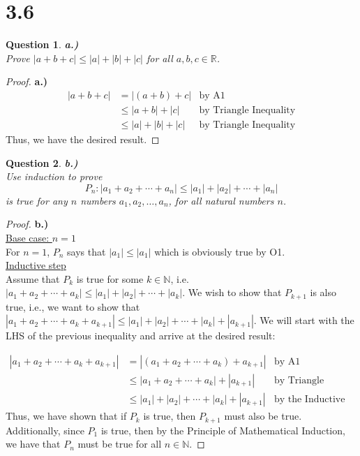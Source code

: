 \documentclass[10pt,a4paper]{article}
\newtheorem*{question*}{Question}
\theoremstyle{definition}
\begin{document}
\section*{3.6}
\begin{question*}{\textbf{a.)}}
\\Prove $|a + b + c| \leq |a| + |b| + |c|$ for all $a,b,c \in \mathbb{R}$.
\end{question*}

\begin{proof}{\textbf{a.)}}
\begin{align*}
|a + b + c| &= |(a + b) + c| &\text{by A1}\\
&\leq |a + b| + |c| &\text{by Triangle Inequality}\\
&\leq |a| + |b| + |c| &\text{by Triangle Inequality}
\end{align*}
Thus, we have the desired result.
\end{proof}

\begin{question*}{\textbf{b.)}}
\\Use induction to prove
\[P_n: |a_1 + a_2 + \cdots + a_n| \leq |a_1| + |a_2| + \cdots + |a_n|\]
is true for any $n$ numbers $a_1, a_2, \ldots, a_n$, for all natural numbers $n$.
\end{question*}

\begin{proof}{\textbf{b.)}}
\\\underline{Base case: $n = 1$}
\\For $n = 1$, $P_n$ says that $|a_1| \leq |a_1|$ which is obviously true by O1. 
\\\underline{Inductive step}
\\Assume that $P_k$ is true for some $k \in \mathbb{N}$, i.e. $|a_1 + a_2 + \cdots + a_k| \leq |a_1| + |a_2| + \cdots + |a_k|$. We wish to show that $P_{k+1}$ is also true, i.e., we want to show that $|a_1 + a_2 + \cdots + a_k + a_{k+1}| \leq |a_1| + |a_2| + \cdots + |a_k| + |a_{k+1}|$. We will start with the LHS of the previous inequality and arrive at the desired result:

\begin{align*}
|a_1 + a_2 + \cdots + a_k + a_{k+1}| &= |(a_1 + a_2 + \cdots + a_k) + a_{k+1}| &\text{by A1}\\
&\leq |a_1 + a_2 + \cdots + a_k| + |a_{k+1}| &\text{by Triangle Inequality}\\
&\leq |a_1| + |a_2| + \cdots + |a_k| + |a_{k+1}| &\text{by the Inductive Hypothesis}
\end{align*}
Thus, we have shown that if $P_k$ is true, then $P_{k+1}$ must also be true. Additionally, since $P_1$ is true, then by the Principle of Mathematical Induction, we have that $P_n$ must be true for all $n \in \mathbb{N}$.
\end{proof}
\end{document}
